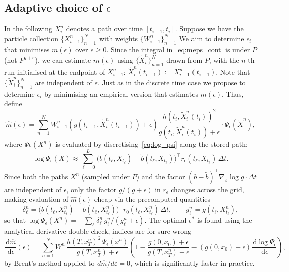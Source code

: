 \documentclass[11pt,reqno]{amsart}
\newcommand{\dd}{{\,\mathrm d}}
\newcommand{\T}{{\top}}
\theoremstyle{definition}
\newcommand{\note}[1]{{\color{Sienna} #1}}
\begin{document}
\subsection{Adaptive choice of $\epsilon$}

In the following $X_i^n$ denotes a path over time $[t_{i-1}, t_i]$. Suppose we have the particle collection $\{X_{i-1}^{n}\}_{n=1}^N$ with weights $\{W_{i-1}^{n}\}_{n=1}^N$
We aim to determine $\epsilon_i$ that  minimises $m(\epsilon)$ over $\epsilon\geq 0$. Since the integral
in~\eqref{eq:meps_cont} is under $P$ (not $P^{g+\varepsilon}$), we can estimate $m(\epsilon)$ using 
$\{\tilde X^n_i\}_{n=1}^N$ drawn from $P$, with the $n$-th run initialised at the endpoint of $X_{i-1}^{n}$: $\tilde X_i^n(t_{i-1}):= X_{i-1}^n(t_{i-1})$. Note that 
$\{\tilde X^n_i\}_{n=1}^N$ are independent of $\epsilon$. 
Just as in the discrete time case we propose to determine $\epsilon_i$ by minimising an empirical version that estimates $m(\epsilon)$. Thus, define \[
  \hat{m}(\epsilon) = 
    \sum_{n=1}^{N} W_{i-1}^n (g(t_{i-1},\tilde X_{i}^n(t_{i-1}))+\epsilon)
    \frac{h(t_i,\tilde X_i^n(t_i))^2}{g(t_i,\tilde X_i^n(t_i))+\epsilon}
    \cdot\Psi_\epsilon(\tilde X^n),
\]
where $\Psi\epsilon(X^n)$ is evaluated by discretising~\eqref{eq:log_psi}
along the stored path:
\[
  \log\Psi_\epsilon(X) \approx \sum_{\ell=0}^{L}
    \bigl(b(t_\ell,X_{t_\ell})-\tilde{b}(t_\ell,X_{t_\ell})\bigr)^\T
    r_\epsilon(t_\ell,X_{t_\ell})\,\Delta t.
\]
Since both the paths $X^n$  (sampled under $P$) and the factor
$(b-\tilde{b})^\top\nabla_x\log g\cdot\Delta t$ are independent of
$\epsilon$, only the factor $g/(g+\epsilon)$ in $r_\epsilon$
changes across the grid, making evaluation of $\hat{m}(\epsilon)$  cheap via
the precomputed quantities
\[
  \delta_\ell^{n} =
    \bigl(b(t_\ell,X_{t_\ell}^n)-\tilde{b}(t_\ell,X_{t_\ell}^n)\bigr)^\T
r_0(t_\ell,X_{t_\ell}^n)\,\Delta t,
  \qquad
  g_\ell^n = g(t_\ell,X_{t_\ell}^n),
\]
so that $\log\Psi_\epsilon(X^n) = -\sum_\ell \delta_\ell^n\,
g_\ell^n/(g_\ell^n+\epsilon)$. The optimal $\epsilon^*$ is found
 using the analytical derivative \note{double check, indices are for sure wrong}
\[
  \frac{\dd\hat{m}}{\dd\epsilon}(\epsilon) =
    \sum_{n=1}^{N} W^{n}\,
    \frac{h(T,x_T^n)^2\,\Psi_\epsilon(x^n)}{g(T,x_T^n)+\epsilon}
    \left(1 - \frac{g(0,x_0)+\epsilon}{g(T,x_T^n)+\epsilon}
    - (g(0,x_0)+\epsilon)\frac{\dd\log\Psi_\epsilon}{\dd\epsilon}\right),
\]
by Brent's method applied to $d\hat{m}/d\varepsilon = 0$, which is
significantly faster in practice.
\end{document}
